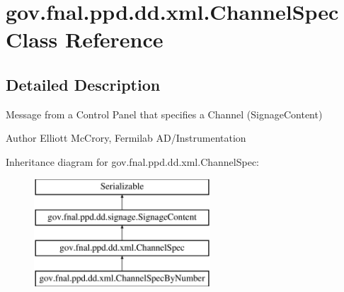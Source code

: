 \hypertarget{classgov_1_1fnal_1_1ppd_1_1dd_1_1xml_1_1ChannelSpec}{\section{gov.\-fnal.\-ppd.\-dd.\-xml.\-Channel\-Spec Class Reference}
\label{classgov_1_1fnal_1_1ppd_1_1dd_1_1xml_1_1ChannelSpec}
}


\subsection{Detailed Description}
Message from a Control Panel that specifies a Channel (Signage\-Content)

\begin{DoxyAuthor}{Author}
Elliott Mc\-Crory, Fermilab A\-D/\-Instrumentation 
\end{DoxyAuthor}
Inheritance diagram for gov.\-fnal.\-ppd.\-dd.\-xml.\-Channel\-Spec\-:\begin{figure}[H]
\begin{center}
\leavevmode
\includegraphics[height=4.000000cm]{classgov_1_1fnal_1_1ppd_1_1dd_1_1xml_1_1ChannelSpec}
\end{center}
\end{figure}
